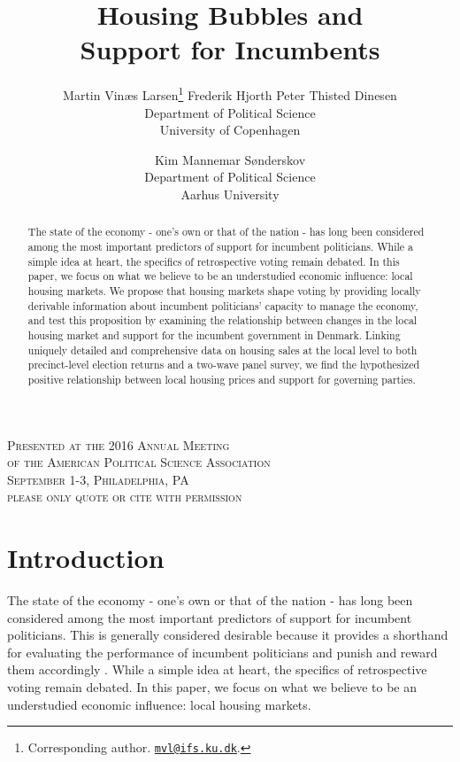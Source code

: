 \documentclass[12pt,a4paper]{article}
\title{\textbf{Housing Bubbles and \\Support for Incumbents}}
\author{Martin Vinæs Larsen\thanks{Corresponding author. \href{mailto:mvl@ifs.ku.dk}{\texttt{mvl@ifs.ku.dk}}. } \qquad Frederik Hjorth \qquad Peter Thisted  Dinesen \\Department of Political Science \\ University of Copenhagen \and Kim Mannemar  Sønderskov  \\Department of Political Science \\ Aarhus University   }
\begin{document}
\maketitle

\begin{center}
	\textsc{Presented at the 2016 Annual Meeting  \\
	of the American Political Science Association \\
	September 1-3, Philadelphia, PA \\[1em]
	please only quote or cite with permission}
\end{center}

\begin{abstract} The state of the economy - one’s own or that of the nation - has long been considered among the most important predictors of support for incumbent politicians. While a simple idea at heart, the specifics of retrospective voting remain debated. In this paper, we focus on what we believe to be an understudied economic influence: local housing markets. We propose that housing markets shape voting by providing locally derivable information about incumbent politicians’ capacity to manage the economy, and test this proposition by examining the relationship between changes in the local housing market and support for the incumbent government in Denmark. Linking uniquely detailed and comprehensive data on housing sales at the local level to both precinct-level election returns and a two-wave panel survey, we find the hypothesized positive relationship between local housing prices and support for governing parties.
 
\end{abstract}








\newpage

\doublespacing

\section{Introduction}

The state of the economy - one’s own or that of the nation - has long been considered among the most important predictors of support for incumbent politicians. This is generally considered desirable because it provides a shorthand for evaluating the performance of incumbent politicians and punish and reward them accordingly \citep{ashworth2012electoral,healy2013retrospective}. While a simple idea at heart, the specifics of retrospective voting remain debated. In this paper, we focus on what we believe to be an understudied economic influence: local housing markets. 
\end{document}
